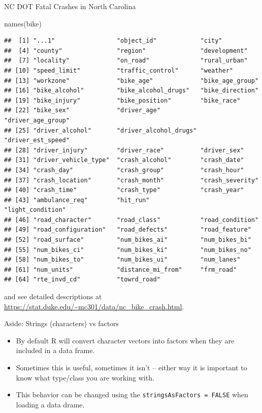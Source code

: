\documentclass[
  ignorenonframetext,
]{beamer}
\newenvironment{Shaded}{\begin{snugshade}}{\end{snugshade}}
\newcommand{\FunctionTok}[1]{\textcolor[rgb]{0.00,0.00,0.00}{#1}}
\newcommand{\NormalTok}[1]{#1}
\begin{document}
\begin{frame}[fragile]{NC DOT Fatal Crashes in North Carolina}
\begin{Shaded}
\begin{Highlighting}[]
\FunctionTok{names}\NormalTok{(bike)}
\end{Highlighting}
\end{Shaded}

\begin{verbatim}
##  [1] "...1"                 "object_id"            "city"                
##  [4] "county"               "region"               "development"         
##  [7] "locality"             "on_road"              "rural_urban"         
## [10] "speed_limit"          "traffic_control"      "weather"             
## [13] "workzone"             "bike_age"             "bike_age_group"      
## [16] "bike_alcohol"         "bike_alcohol_drugs"   "bike_direction"      
## [19] "bike_injury"          "bike_position"        "bike_race"           
## [22] "bike_sex"             "driver_age"           "driver_age_group"    
## [25] "driver_alcohol"       "driver_alcohol_drugs" "driver_est_speed"    
## [28] "driver_injury"        "driver_race"          "driver_sex"          
## [31] "driver_vehicle_type"  "crash_alcohol"        "crash_date"          
## [34] "crash_day"            "crash_group"          "crash_hour"          
## [37] "crash_location"       "crash_month"          "crash_severity"      
## [40] "crash_time"           "crash_type"           "crash_year"          
## [43] "ambulance_req"        "hit_run"              "light_condition"     
## [46] "road_character"       "road_class"           "road_condition"      
## [49] "road_configuration"   "road_defects"         "road_feature"        
## [52] "road_surface"         "num_bikes_ai"         "num_bikes_bi"        
## [55] "num_bikes_ci"         "num_bikes_ki"         "num_bikes_no"        
## [58] "num_bikes_to"         "num_bikes_ui"         "num_lanes"           
## [61] "num_units"            "distance_mi_from"     "frm_road"            
## [64] "rte_invd_cd"          "towrd_road"
\end{verbatim}

and see detailed descriptions at
\url{https://stat.duke.edu/~mc301/data/nc_bike_crash.html}.
\end{frame}

\begin{frame}[fragile]{Aside: Strings (characters) vs factors}
\protect\hypertarget{aside-strings-characters-vs-factors}{}
\begin{itemize}
\item
  By default R will convert character vectors into factors when they are
  included in a data frame.
\item
  Sometimes this is useful, sometimes it isn't -- either way it is
  important to know what type/class you are working with.
\item
  This behavior can be changed using the
  \texttt{stringsAsFactors\ =\ FALSE} when loading a data drame.
\end{itemize}
\end{frame}
\end{document}
